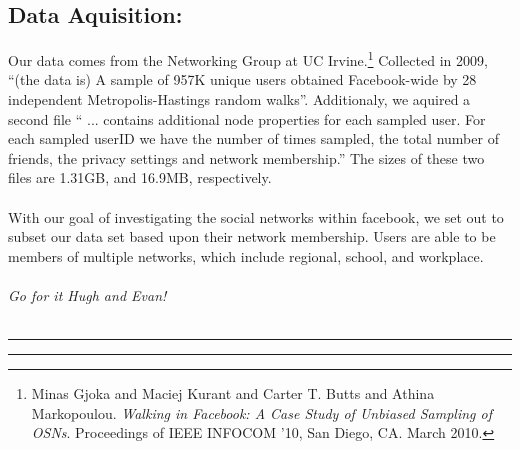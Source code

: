 \documentclass[fleqn]{article}
\begin{document}
\subsection*{Data Aquisition:} Our data comes from the Networking Group at UC Irvine.\footnote{Minas Gjoka and Maciej Kurant and Carter T. Butts and Athina Markopoulou. \emph{Walking in Facebook: A Case Study of Unbiased Sampling of OSNs}. Proceedings of IEEE INFOCOM '10, San Diego, CA. March 2010.} Collected in 2009, ``(the data is) A sample of 957K unique users obtained Facebook-wide by 28 independent Metropolis-Hastings random walks''. Additionaly, we aquired a second file `` ... contains additional node properties for each sampled user. For each sampled userID we have the number of times sampled, the total number of friends, the privacy settings and network membership.'' The sizes of these two files are 1.31GB, and 16.9MB, respectively. \\ \\ 
With our goal of investigating the social networks within facebook, we set out to subset our data set based upon their network membership. Users are able to be members of multiple networks, which include regional, school, and workplace. \\ \\
\emph{Go for it Hugh and Evan!} \\ \\

\hrule \hrule 
\end{document}
